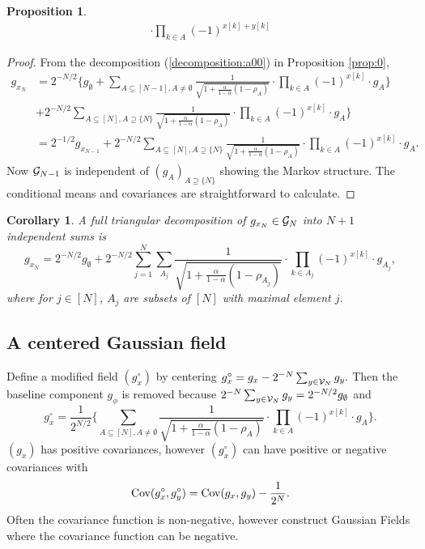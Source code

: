 \documentclass[preprint,11pt]{elsarticle}
\newtheorem{Corollary}{Corollary}
\newtheorem{Proposition}{Proposition}
\theoremstyle{remark}
\begin{document}
{\begin{Proposition}
\begin{align}
\cdot \prod_{k\in A}(-1)^{{ x}[k]+{y}[k]}
\nonumber
\end{align}
\end{Proposition}
\begin{proof}
From the decomposition (\ref{decomposition:a00}) in Proposition \ref{prop:0},
\begin{align}
g_{{x}_N} &= 2^{-N/2}\Big \{g_\emptyset 
+ \sum_{A\subseteq [N-1], A \ne \emptyset} \frac{1}{\sqrt{1 + \frac{\alpha}{1-\alpha}(1-\rho_A)}}
\cdot \prod_{k\in A}(-1)^{{x}[k]}\cdot g_A\Big \}\nonumber\\
&+ 2^{-N/2}\sum_{A\subseteq [N], A \supseteq \{N\}} \frac{1}{\sqrt{1 + \frac{\alpha}{1-\alpha}(1-\rho_A)}}
\cdot \prod_{k\in A}(-1)^{{x}[k]}\cdot g_A\Big \}\nonumber\\
&= 2^{-1/2}g_{{ x}_{N-1}}+ 2^{-N/2}\sum_{A\subseteq [N], A \supseteq \{N\}} \frac{1}{\sqrt{1 + \frac{\alpha}{1-\alpha}(1-\rho_A)}}
\cdot \prod_{k\in A}(-1)^{{x}[k]}\cdot g_A.
\nonumber
\end{align}
Now ${\cal G}_{N-1}$ is independent of $(g_A)_{A\supseteq \{N\}}$  showing the Markov structure. The conditional means and covariances are straightforward to calculate.
\end{proof}
%
\begin{Corollary}
A full triangular decomposition of $g_{{x}_N} \in {\cal G}_N$ into $N+1$ independent sums is
\begin{equation*}
g_{{x}_N} = 2^{-N/2}g_\emptyset+
 2^{-N/2} \sum_{j=1}^N\sum_{A_j} \frac{1}{\sqrt{1 + \frac{\alpha}{1-\alpha}(1-\rho_{A_j})}}
\cdot \prod_{k\in A_j}(-1)^{{x}[k]}\cdot g_{A_j},
\label{triangle:000}
\end{equation*} 
where for $j \in [N]$, $A_j$ are subsets of $[N]$ with maximal element $j$.
\end{Corollary}
%
\subsection{A centered Gaussian field}\label{GaussCentre:sec}
Define a modified field $(g^\circ_x)$  by centering
$
g^\circ_x = g_x - 2^{-N}\sum_{y\in {\cal V}_N}g_y. 
$
Then the baseline component $g_\phi$ is removed because
$
2^{-N}\sum_{y\in {\cal V}_N}g_y = 2^{-N/2}g_\emptyset
$
and
\begin{equation*}
g^\circ_x = \frac{1}{2^{N/2}}\Big \{
\sum_{A\subseteq [N], A \ne \emptyset}
 \frac{1}{\sqrt{1 + \frac{\alpha}{1-\alpha}(1-\rho_A)} }\cdot
 \prod_{k\in A}(-1)^{x[k]}\cdot g_A\Big \}
 \label{decomposition:a000}.
\end{equation*}
$(g_x)$ has positive covariances, however $(g^\circ_x)$ can have positive or negative covariances with
\[
\text{\rm Cov}(g^\circ_x,g^\circ_y) = \text{Cov}(g_x,g_y) - \frac{1}{2^N}.
\]
 Often the covariance function is non-negative, however \cite{DE2002} construct Gaussian Fields where the covariance function can be negative.
 
}
\end{document}
